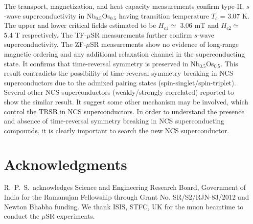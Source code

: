 \documentclass[reprint, superscriptaddress, secnumarabic, amssymb, nobibnotes, aps, prl]{revtex4-1}
\begin{document}
The transport, magnetization, and heat capacity measurements confirm type-II, $\textit{s}$-wave superconductivity in Nb$_{0.5}$Os$_{0.5}$ having transition temperature $T_{c}$ = 3.07 K. The upper and lower critical fields estimated to be $H_{c1}$$\simeq$ 3.06 mT and $H_{c2}$$\simeq$ 5.4 T respectively. The TF-$\mu$SR measurements further confirm $\textit{s}$-wave superconductivity. The ZF-$\mu$SR measurements show no evidence of long-range magnetic ordering and any additional relaxation channel in the superconducting state. It confirms that time-reversal symmetry is preserved in Nb$_{0.5}$Os$_{0.5}$. This result contradicts the possibility of time-reversal symmetry breaking in NCS superconductors due to the admixed pairing states (spin-singlet/spin-triplet). Several other NCS superconductors (weakly/strongly correlated) reported to show the similar result. It suggest some other mechanism may be involved, which control the TRSB in NCS superconductors. In order to understand the presence and absence of time-reversal symmetry breaking in NCS superconducting compounds, it is clearly important to search the new NCS superconductor.

\section{Acknowledgments}

R.~P.~S.\ acknowledges Science and Engineering Research Board, Government of India for the Ramanujan Fellowship through Grant No. SR/S2/RJN-83/2012 and Newton Bhabha funding. We thank ISIS, STFC, UK for the muon beamtime to conduct the $\mu$SR experiments. 
\end{document}
